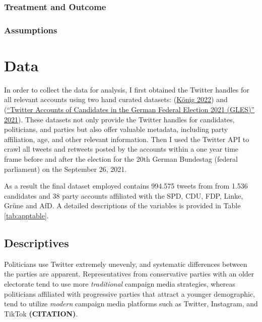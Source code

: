 \documentclass[a4paper,11pt]{article}
\begin{document}
\hypertarget{treatment-and-outcome}{%
\subsubsection{Treatment and Outcome}\label{treatment-and-outcome}}

\hypertarget{assumptions}{%
\subsubsection{Assumptions}\label{assumptions}}

\newpage

\hypertarget{data}{%
\section{Data}\label{data}}

In order to collect the data for analysis, I first obtained the Twitter handles for all relevant accounts using two hand curated datasets: (\protect\hyperlink{ref-konigEPINetzTwitterPoliticians2022}{König 2022}) and (\protect\hyperlink{ref-saltzerTwitterAccountsCandidates2021}{{``Twitter Accounts of Candidates in the {German} Federal Election 2021 ({GLES})''} 2021}). These datasets not only provide the Twitter handles for candidates, politicians, and parties but also offer valuable metadata, including party affiliation, age, and other relevant information. Then I used the Twitter API to crawl all tweets and retweets posted by the accounts within a one year time frame before and after the election for the 20th German Bundestag (federal parliament) on the September 26, 2021.

As a result the final dataset employed contains 994.575 tweets from from 1.536 candidates and 38 party accounts affiliated with the SPD, CDU, FDP, Linke, Grüne and AfD. A detailed descriptions of the variables is provided in Table \ref{tab:apptable}.

\hypertarget{descriptives}{%
\subsection{Descriptives}\label{descriptives}}

Politicians use Twitter extremely unevenly, and systematic differences between the parties are apparent. Representatives from conservative parties with an older electorate tend to use more \emph{traditional} campaign media strategies, whereas politicians affiliated with progressive parties that attract a younger demographic, tend to utilize \emph{modern} campaign media platforms such as Twitter, Instagram, and TikTok \textbf{(CITATION)}.
\end{document}
